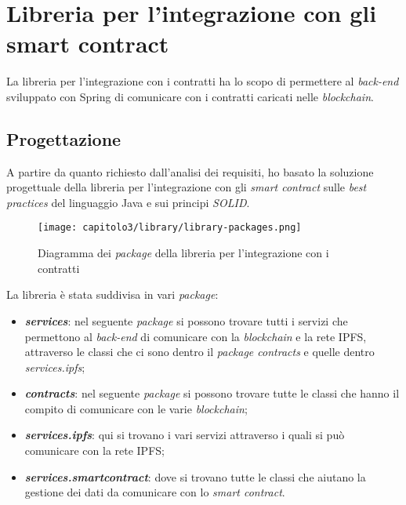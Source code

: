
\section{Libreria per l'integrazione con gli smart contract}
La libreria per l'integrazione con i contratti ha lo scopo di permettere al \textit{back-end} sviluppato con Spring di comunicare con i contratti caricati nelle \textit{blockchain}.

\subsection{Progettazione}
A partire da quanto richiesto dall'analisi dei requisiti, ho basato la soluzione progettuale della libreria per l'integrazione con gli \textit{smart contract} sulle \textit{best practices} del linguaggio Java e sui principi \textit{SOLID}. \\

\begin{figure}[h!]
  \centering
  \texttt{[image: capitolo3/library/library-packages.png]}
  \caption{Diagramma dei \textit{package} della libreria per l'integrazione con i contratti}
\end{figure}

\noindent La libreria è stata suddivisa in vari \textit{package}:
\begin{itemize}
  \item \textbf{\textit{services}}: nel seguente \textit{package} si possono trovare tutti i servizi che permettono al \textit{back-end} di comunicare con la \textit{blockchain} e la rete IPFS, attraverso le classi che ci sono dentro il \textit{package contracts} e quelle dentro \textit{services.ipfs};

  \item \textbf{\textit{contracts}}: nel seguente \textit{package} si possono trovare tutte le classi che hanno il compito di comunicare con le varie \textit{blockchain};

  \item \textbf{\textit{services.ipfs}}: qui si trovano i vari servizi attraverso i quali si può comunicare con la rete IPFS;
  
  \item \textbf{\textit{services.smartcontract}}: dove si trovano tutte le classi che aiutano la gestione dei dati da comunicare con lo \textit{smart contract}.
\end{itemize}

